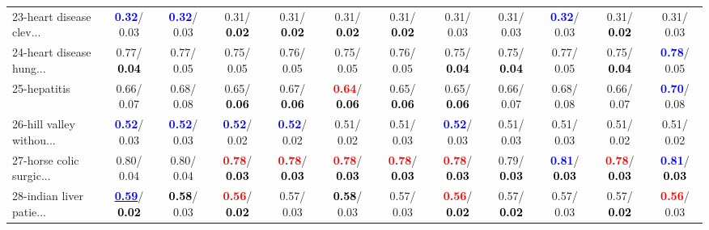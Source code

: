 \begin{table}[h]
\begin{center}
{\begin{tabular}{lc|c|c|c|c|c|c|c|c|c|c}
23-heart disease clev... & \textcolor{blue}{\textbf{  0.32}}/  0.03 & \textcolor{blue}{\textbf{  0.32}}/  0.03 &   0.31/\textcolor{black}{\textbf{  0.02}} &   0.31/\textcolor{black}{\textbf{  0.02}} &   0.31/\textcolor{black}{\textbf{  0.02}} &   0.31/\textcolor{black}{\textbf{  0.02}} &   0.31/  0.03 &   0.31/  0.03 & \textcolor{blue}{\textbf{  0.32}}/  0.03 &   0.31/\textcolor{black}{\textbf{  0.02}} &   0.31/  0.03 \\
24-heart disease hung... &   0.77/\textcolor{black}{\textbf{  0.04}} &   0.77/  0.05 &   0.75/  0.05 &   0.76/  0.05 &   0.75/  0.05 &   0.76/  0.05 &   0.75/\textcolor{black}{\textbf{  0.04}} &   0.75/\textcolor{black}{\textbf{  0.04}} &   0.77/  0.05 &   0.75/\textcolor{black}{\textbf{  0.04}} & \textcolor{blue}{\textbf{  0.78}}/  0.05 \\
25-hepatitis &   0.66/  0.07 &   0.68/  0.08 &   0.65/\textcolor{black}{\textbf{  0.06}} &   0.67/\textcolor{black}{\textbf{  0.06}} & \textcolor{red}{\textbf{  0.64}}/\textcolor{black}{\textbf{  0.06}} &   0.65/\textcolor{black}{\textbf{  0.06}} &   0.65/\textcolor{black}{\textbf{  0.06}} &   0.66/  0.07 &   0.68/  0.08 &   0.66/  0.07 & \textcolor{blue}{\textbf{  0.70}}/  0.08 \\
26-hill valley withou... & \textcolor{blue}{\textbf{  0.52}}/  0.03 & \textcolor{blue}{\textbf{  0.52}}/  0.03 & \textcolor{blue}{\textbf{  0.52}}/  0.02 & \textcolor{blue}{\textbf{  0.52}}/  0.02 &   0.51/  0.02 &   0.51/  0.03 & \textcolor{blue}{\textbf{  0.52}}/  0.03 &   0.51/  0.03 &   0.51/  0.03 &   0.51/  0.02 &   0.51/  0.02 \\
27-horse colic surgic... &   0.80/  0.04 &   0.80/  0.04 & \textcolor{red}{\textbf{  0.78}}/\textcolor{black}{\textbf{  0.03}} & \textcolor{red}{\textbf{  0.78}}/\textcolor{black}{\textbf{  0.03}} & \textcolor{red}{\textbf{  0.78}}/\textcolor{black}{\textbf{  0.03}} & \textcolor{red}{\textbf{  0.78}}/\textcolor{black}{\textbf{  0.03}} & \textcolor{red}{\textbf{  0.78}}/\textcolor{black}{\textbf{  0.03}} &   0.79/\textcolor{black}{\textbf{  0.03}} & \textcolor{blue}{\textbf{  0.81}}/\textcolor{black}{\textbf{  0.03}} & \textcolor{red}{\textbf{  0.78}}/\textcolor{black}{\textbf{  0.03}} & \textcolor{blue}{\textbf{  0.81}}/\textcolor{black}{\textbf{  0.03}} \\
28-indian liver patie... & \underline{\textcolor{blue}{\textbf{  0.59}}}/\textcolor{black}{\textbf{  0.02}} & \textcolor{black}{\textbf{  0.58}}/  0.03 & \textcolor{red}{\textbf{  0.56}}/\textcolor{black}{\textbf{  0.02}} &   0.57/  0.03 & \textcolor{black}{\textbf{  0.58}}/  0.03 &   0.57/  0.03 & \textcolor{red}{\textbf{  0.56}}/\textcolor{black}{\textbf{  0.02}} &   0.57/\textcolor{black}{\textbf{  0.02}} &   0.57/  0.03 &   0.57/\textcolor{black}{\textbf{  0.02}} & \textcolor{red}{\textbf{  0.56}}/  0.03 \\ \hline

\end{tabular}}
\end{center}
\end{table}
